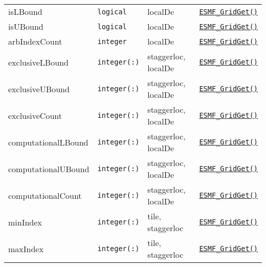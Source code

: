\begin{table}[h!p!b!]
\begin{tabular}{|l|l|l|l|}
    isLBound & {\tt logical} & localDe & \hyperref[API:GridGetPLocalDe]{\tt ESMF\_GridGet()}\\
    isUBound & {\tt logical} & localDe & \hyperref[API:GridGetPLocalDe]{\tt ESMF\_GridGet()}\\
    arbIndexCount & {\tt integer} & localDe & \hyperref[API:GridGetPLocalDe]{\tt ESMF\_GridGet()}\\
    exclusiveLBound & {\tt integer(:)} & staggerloc, localDe & \hyperref[API:GridGetPLocalDePSloc]{\tt ESMF\_GridGet()}\\
    exclusiveUBound & {\tt integer(:)} & staggerloc, localDe & \hyperref[API:GridGetPLocalDePSloc]{\tt ESMF\_GridGet()}\\
    exclusiveCount & {\tt integer(:)} & staggerloc, localDe & \hyperref[API:GridGetPLocalDePSloc]{\tt ESMF\_GridGet()}\\
    computationalLBound & {\tt integer(:)} & staggerloc, localDe & \hyperref[API:GridGetPLocalDePSloc]{\tt ESMF\_GridGet()}\\
    computationalUBound & {\tt integer(:)} & staggerloc, localDe & \hyperref[API:GridGetPLocalDePSloc]{\tt ESMF\_GridGet()}\\
    computationalCount & {\tt integer(:)} & staggerloc, localDe & \hyperref[API:GridGetPLocalDePSloc]{\tt ESMF\_GridGet()}\\
    minIndex & {\tt integer(:)} & tile, staggerloc & \hyperref[API:GridGetPSlocPTile]{\tt ESMF\_GridGet()}\\
    maxIndex & {\tt integer(:)} & tile, staggerloc & \hyperref[API:GridGetPSlocPTile]{\tt ESMF\_GridGet()}\\
    \hline
  \end{tabular}
  \label{AttributeInternalInfo-Get}
\end{table}

